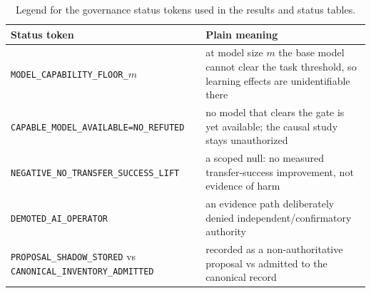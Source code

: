 \begin{table}[htbp]
\footnotesize
\begin{tabular}{@{}p{} p{}@{}}
\hline
\textbf{Status token} & \textbf{Plain meaning} \\
\hline
\texttt{MODEL\_CAPABILITY\_FLOOR\_$m$} & at model size $m$ the base model cannot clear the task threshold, so learning effects are unidentifiable there \\
\texttt{CAPABLE\_MODEL\_AVAILABLE=NO\_REFUTED} & no model that clears the gate is yet available; the causal study stays unauthorized \\
\texttt{NEGATIVE\_NO\_TRANSFER\_SUCCESS\_LIFT} & a scoped null: no measured transfer-success improvement, not evidence of harm \\
\texttt{DEMOTED\_AI\_OPERATOR} & an evidence path deliberately denied independent/confirmatory authority \\
\texttt{PROPOSAL\_SHADOW\_STORED} vs \texttt{CANONICAL\_INVENTORY\_ADMITTED} & recorded as a non-authoritative proposal vs admitted to the canonical record \\
\hline
\end{tabular}
\caption{Legend for the governance status tokens used in the results and status tables.}
\label{tab:status-legend}
\end{table}